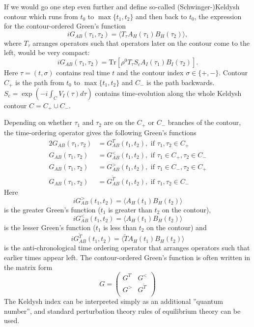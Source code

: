 If we would go one step even further and define so-called (Schwinger-)Keldysh contour which runs from $t_0$ to $\max\{t_1,t_2\}$ and then back to $t_0$, the expression for the contour-ordered Green's function
\begin{equation}
 iG_{AB}(\tau_1,\tau_2) = \langle T_{\tau} A_H(\tau_1)B_H(\tau_2) \rangle,
\end{equation}
where $T_{\tau}$ arranges operators such that operators later on the contour come to the left, would be very compact:
\begin{equation}
 iG_{AB}(\tau_1,\tau_2) = \textrm{Tr}\left[ \rho^0 T_{\tau} S_c A_I(\tau_1)  B_I(\tau_2) \right].
\end{equation}
Here $\tau=(t,\sigma)$ contains real time $t$ and the contour index $\sigma \in \{+,-\}$. Contour $C_+$ is the path from $t_0$ to $\max\{t_1,t_2\}$ and $C_-$ is the path backwards. $S_c=\exp\left(-i\int_C V_I(\tau) d\tau\right)$ contains time-evolution along the whole Keldysh contour $C=C_+\cup C_-$.

Depending on whether $\tau_1$ and $\tau_2$ are on the $C_+$ or $C_-$ branches of the contour, the time-ordering operator gives the following Green's functions
\begin{alignat}{2}
  G_{AB}(\tau_1,\tau_2) &= G^T_{AB}(t_1,t_2), \textrm{ if }  \tau_1,\tau_2 \in C_+ \\
  G_{AB}(\tau_1,\tau_2) &= G^<_{AB}(t_1,t_2), \textrm{ if }  \tau_1 \in C_+, \tau_2 \in C_- \\
  G_{AB}(\tau_1,\tau_2) &= G^>_{AB}(t_1,t_2), \textrm{ if }  \tau_1 \in C_-, \tau_2 \in C_+ \\
  G_{AB}(\tau_1,\tau_2) &= G^{\tilde{T}}_{AB}(t_1,t_2), \textrm{ if } \tau_1,\tau_2 \in C_-
\end{alignat}
Here 
\begin{equation}
 iG^>_{AB}(t_1,t_2) = \langle A_H(t_1)B_H(t_2) \rangle
\end{equation}
is the greater Green's function ($t_1$ is greater than $t_2$ on the contour),
\begin{equation}
 iG^<_{AB}(t_1,t_2) = \langle A_H(t_1)B_H(t_2) \rangle
\end{equation}
is the lesser Green's function ($t_1$ is less than $t_2$ on the contour)
and
\begin{equation}
 iG^{\tilde{T}}_{AB}(t_1,t_2) = \langle \tilde{T} A_H(t_1)B_H(t_2) \rangle
\end{equation}
is the anti-chronological time ordering operator that arranges operators such that earlier times appear left. The contour-ordered Green's function is often written in the matrix form
\begin{equation}
 G = \left(\begin{matrix}
      G^T & G^< \\
      G^> & G^{\tilde{T}} \\
     \end{matrix}\right)
\end{equation}
The Keldysh index can be interpreted simply as an additional ''quantum number'', and standard perturbation theory rules of equilibrium theory can be used.

